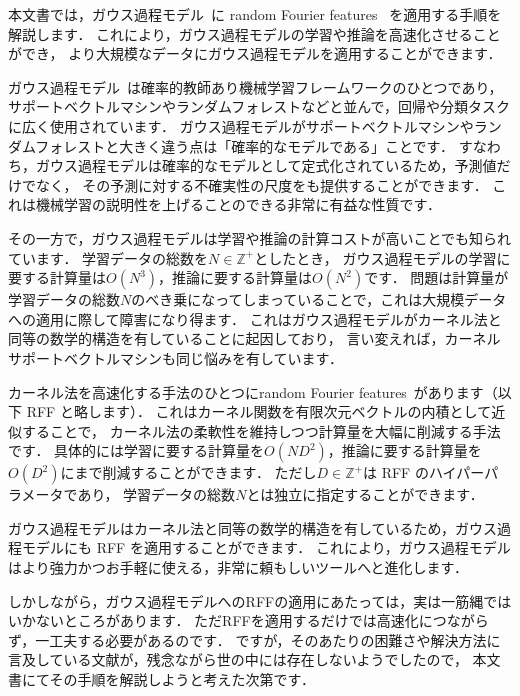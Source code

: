 %

本文書では，ガウス過程モデル~\cite{Rahimi2007}に
random Fourier features~\cite{Rasmussen2006} を適用する手順を解説します．
これにより，ガウス過程モデルの学習や推論を高速化させることができ，
より大規模なデータにガウス過程モデルを適用することができます．

ガウス過程モデル~\cite{Rahimi2007}は確率的教師あり機械学習フレームワークのひとつであり，
サポートベクトルマシンやランダムフォレストなどと並んで，回帰や分類タスクに広く使用されています．
ガウス過程モデルがサポートベクトルマシンやランダムフォレストと大きく違う点は「確率的なモデルである」ことです．
すなわち，ガウス過程モデルは確率的なモデルとして定式化されているため，予測値だけでなく，
その予測に対する不確実性の尺度をも提供することができます．
これは機械学習の説明性を上げることのできる非常に有益な性質です．

その一方で，ガウス過程モデルは学習や推論の計算コストが高いことでも知られています．
学習データの総数を$N \in \mathbb{Z}^{+}$としたとき，
ガウス過程モデルの学習に要する計算量は$O(N^3)$，推論に要する計算量は$O(N^2)$です．
問題は計算量が学習データの総数$N$のべき乗になってしまっていることで，これは大規模データへの適用に際して障害になり得ます．
これはガウス過程モデルがカーネル法と同等の数学的構造を有していることに起因しており，
言い変えれば，カーネルサポートベクトルマシンも同じ悩みを有しています．

カーネル法を高速化する手法のひとつにrandom Fourier features~\cite{Rasmussen2006}があります（以下 RFF と略します）．
これはカーネル関数を有限次元ベクトルの内積として近似することで，
カーネル法の柔軟性を維持しつつ計算量を大幅に削減する手法です．
具体的には学習に要する計算量を$O(N D^2)$，推論に要する計算量を$O(D^2)$にまで削減することができます．
ただし$D \in \mathbb{Z}^{+}$は RFF のハイパーパラメータであり，
学習データの総数$N$とは独立に指定することができます．

ガウス過程モデルはカーネル法と同等の数学的構造を有しているため，ガウス過程モデルにも RFF を適用することができます．
これにより，ガウス過程モデルはより強力かつお手軽に使える，非常に頼もしいツールへと進化します．


しかしながら，ガウス過程モデルへのRFFの適用にあたっては，実は一筋縄ではいかないところがあります．
ただRFFを適用するだけでは高速化につながらず，一工夫する必要があるのです．
ですが，そのあたりの困難さや解決方法に言及している文献が，残念ながら世の中には存在しないようでしたので，
本文書にてその手順を解説しようと考えた次第です．

